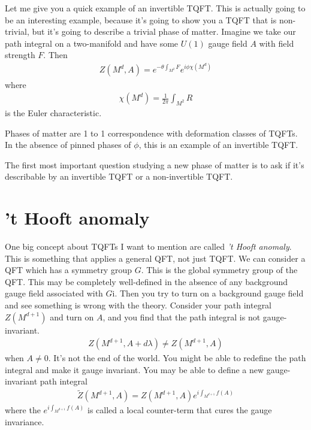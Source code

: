Let me give you a quick example of an invertible TQFT.\@
This is actually going to be an interesting example,
because it's going to show you a TQFT that is non-trivial,
but it's going to describe a trivial phase of matter.
Imagine we take our path integral on a two-manifold
and have some $U(1)$ gauge field $A$ with field strength $F$.
Then
\begin{align}
    Z\left( M^d, A \right)
    =
    e^{-\theta \int_{M^2} F}
    e^{i\phi \chi\left( M^d \right)}
\end{align}
where
\begin{align}
    \chi\left( M^d \right) = \frac{1}{2\pi}\int_{M^2}R
\end{align}
is the Euler characteristic.

Phases of matter are 1 to 1 correspondence with deformation classes of TQFTs.
In the absence of pinned phases of $\phi$,
this is an example of an invertible TQFT.\@

The first most important question studying a new phase of matter is to ask if
it's describable by an invertible TQFT or a non-invertible TQFT.\@

\section{'t Hooft anomaly}
One big concept about TQFTs I want to mention are called
\emph{'t Hooft anomaly}.
This is something that applies a general QFT,
not just TQFT.
We can consider a QFT which has a symmetry group $G$.
This is the global symmetry group of the QFT.
This may be completely well-defined in the absence of any background gauge field
associated with $G$i.
Then you try to turn on a background gauge field and see something is wrong
with the theory.
Consider your path integral $Z(M^{d+1})$ and turn on $A$,
and you find that the path integral is not gauge-invariant.
\begin{align}
    Z\left( M^{d+1}, A + d\lambda \right)
    \ne
    Z\left( M^{d+1}, A \right)
\end{align}
when $A\ne 0$.
It's not the end of the world.
You might be able to redefine the path integral and make it gauge invariant.
You may be able to define a new gauge-invariant path integral
\begin{align}
    \tilde{Z}\left( M^{d+1}, A \right)
    = Z\left( M^{d+1}, A \right)
    e^{i\int_{M^{d+1}} f(A)}
\end{align}
where the $e^{i\int_{M^{d+1}} f(A)}$
is called a local counter-term that cures the gauge invariance.


